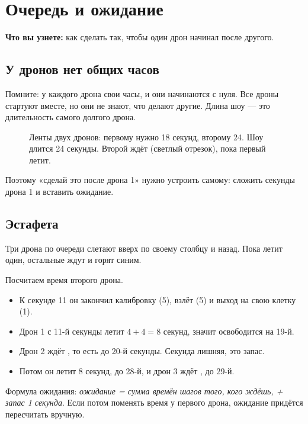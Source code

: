 \chapter{Очередь и ожидание}\label{ch:ochered}

\textbf{Что вы узнете:} как сделать так, чтобы один дрон начинал после другого.

\section{У дронов нет общих часов}

Помните: у каждого дрона свои часы, и они начинаются с нуля. Все дроны стартуют вместе, но они не знают, что делают другие. Длина шоу — это длительность самого долгого дрона.

\begin{figure}[H]
  \centering
  
  \caption{Ленты двух дронов: первому нужно 18 секунд, второму 24. Шоу длится 24 секунды. Второй ждёт (светлый отрезок), пока первый летит.}\label{fig:clocks}
\end{figure}

Поэтому «сделай это после дрона 1» нужно устроить самому: сложить секунды дрона 1 и вставить ожидание.

\section{Эстафета}

Три дрона по очереди слетают вверх по своему столбцу и назад. Пока летит один, остальные ждут и горят синим.


Посчитаем время второго дрона.
\begin{itemize}
  \item К секунде 11 он закончил калибровку (5), взлёт (5) и выход на свою клетку (1).
  \item Дрон 1 с 11-й секунды летит $4 + 4 = 8$ секунд, значит освободится на 19-й.
  \item Дрон 2 ждёт , то есть до 20-й секунды. Секунда лишняя, это запас.
  \item Потом он летит 8 секунд, до 28-й, и дрон 3 ждёт , до 29-й.
\end{itemize}

\begin{zametka}
Формула ожидания: \emph{ожидание = сумма времён шагов того, кого ждёшь, + запас 1 секунда}. Если потом поменять время у первого дрона, ожидание придётся пересчитать вручную.
\end{zametka}

